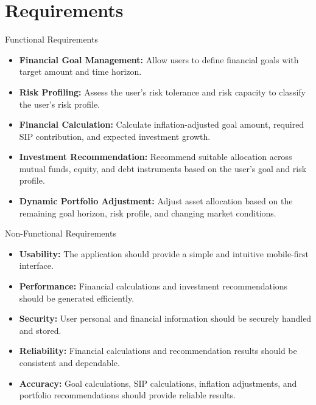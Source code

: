 \documentclass{beamer}
\begin{document}
\section{Requirements}
\begin{frame}{Functional Requirements}

\small

\begin{itemize}
    \setlength{\itemsep}{8pt}

    \item \textbf{Financial Goal Management:}
    Allow users to define financial goals with target amount and time horizon.

    \item \textbf{Risk Profiling:}
    Assess the user's risk tolerance and risk capacity to classify the user's risk profile.

    \item \textbf{Financial Calculation:}
    Calculate inflation-adjusted goal amount, required SIP contribution, and expected investment growth.

    \item \textbf{Investment Recommendation:}
    Recommend suitable allocation across mutual funds, equity, and debt instruments based on the user's goal and risk profile.

    \item \textbf{Dynamic Portfolio Adjustment:}
    Adjust asset allocation based on the remaining goal horizon, risk profile, and changing market conditions.

\end{itemize}

\end{frame}

\begin{frame}{Non-Functional Requirements}

\small

\begin{itemize}
    \setlength{\itemsep}{9pt}

    \item \textbf{Usability:}
    The application should provide a simple and intuitive mobile-first interface.

    \item \textbf{Performance:}
    Financial calculations and investment recommendations should be generated efficiently.

    \item \textbf{Security:}
    User personal and financial information should be securely handled and stored.

    \item \textbf{Reliability:}
    Financial calculations and recommendation results should be consistent and dependable.

    \item \textbf{Accuracy:}
    Goal calculations, SIP calculations, inflation adjustments, and portfolio recommendations should provide reliable results.

\end{itemize}

\end{frame}
\end{document}
